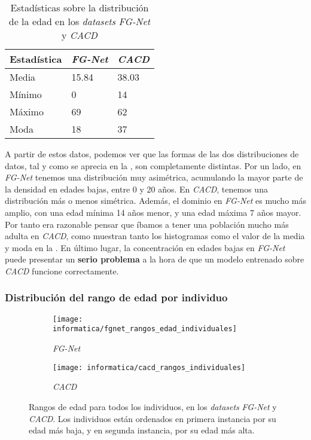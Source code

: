 \begin{table}[!hbtp]
\centering
\begin{tabular}{|l|l|l|}
    \hline
    \textbf{Estadística} & \textbf{\textit{FG-Net}} & \textbf{\textit{CACD}} \\
    \hline

    Media  & 15.84 & 38.03 \\
    Mínimo & 0     & 14    \\
    Máximo & 69    & 62    \\
    Moda   & 18    & 37    \\

    \hline

\end{tabular}
    \caption{Estadísticas sobre la distribución de la edad en los \textit{datasets} \textit{FG-Net} y \textit{CACD}}
    \label{table:conjunta_fgnet_cacd_estadisticas_edad}
\end{table}

A partir de estos datos, podemos ver que las formas de las dos distribuciones de datos, tal y como se aprecia en la , son completamente distintas. Por un lado, en \textit{FG-Net} tenemos una distribución muy asimétrica, acumulando la mayor parte de la densidad en edades bajas, entre 0 y 20 años. En \textit{CACD}, tenemos una distribución más o menos simétrica. Además, el dominio en \textit{FG-Net} es mucho más amplio, con una edad mínima 14 años menor, y una edad máxima 7 años mayor. Por tanto era razonable pensar que íbamos a tener una población mucho más adulta en \textit{CACD}, como muestran tanto los histogramas como el valor de la media y moda en la . En último lugar, la concentración en edades bajas en \textit{FG-Net} puede presentar un \textbf{serio problema} a la hora de que un modelo entrenado sobre \textit{CACD} funcione correctamente.

\subsubsection{Distribución del rango de edad por individuo}

\begin{figure}[!hbtp]
    \centering
    \begin{subfigure}[t]{0.55\textwidth}
        \centering
        \texttt{[image: informatica/fgnet\_rangos\_edad\_individuales]}
        \caption{\textit{FG-Net}}
    \end{subfigure}
    \begin{subfigure}[t]{0.4\textwidth}
        \centering
        \texttt{[image: informatica/cacd\_rangos\_individuales]}
        \caption{\textit{CACD}}
    \end{subfigure}

    \caption{Rangos de edad para todos los individuos, en los \textit{datasets} \textit{FG-Net} y \textit{CACD}. Los individuos están ordenados en primera instancia por su edad más baja, y en segunda instancia, por su edad más alta.}
    \label{img:conjunta_fgnet_rangos_edades_individuales}
\end{figure}

